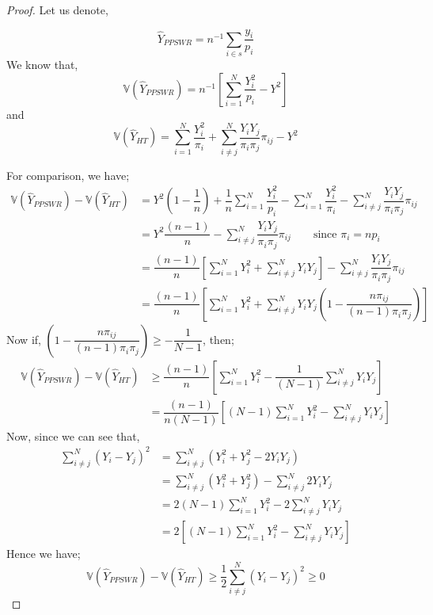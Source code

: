 \documentclass[12pt]{article}
\newcommand{\Var}{\mathbb{V}}
\theoremstyle{definition}
\begin{document}
\begin{proof}

    Let us denote, 

    \begin{equation}
        \hat{Y}_{PPSWR} = n^{-1} \sum_{i \in s} \dfrac{y_i}{p_i}
        \label{eqn:PPSWR-est}
    \end{equation}
    We know that, 
    \begin{equation}
        \Var(\hat{Y}_{PPSWR}) = n^{-1} \left[ \sum_{i=1}^N \dfrac{Y_i^2}{p_i}  - Y^2 \right]
        \label{eqn:PPSWR-var}
    \end{equation}
    and 
    \begin{equation}
        \Var(\hat{Y}_{HT}) = \sum_{i=1}^N \dfrac{Y_i^2}{\pi_i} + \sum_{i\neq j}^{N} \dfrac{Y_i Y_j}{\pi_i \pi_j} \pi_{ij} - Y^2
        \label{eqn:HT-var}
    \end{equation}
    
    For comparison, we have;
    \begin{align*}
        \Var(\hat{Y}_{PPSWR}) - \Var(\hat{Y}_{HT}) 
        & = Y^2 \left( 1 - \dfrac{1}{n} \right) + \dfrac{1}{n} \sum_{i=1}^N \dfrac{Y_i^2}{p_i} - \sum_{i=1}^N \dfrac{Y_i^2}{\pi_i} - \sum_{i\neq j}^{N} \dfrac{Y_i Y_j}{\pi_i \pi_j} \pi_{ij}\\
        & = Y^2 \dfrac{(n-1)}{n} - \sum_{i\neq j}^{N} \dfrac{Y_i Y_j}{\pi_i \pi_j} \pi_{ij} \qquad \text{since } \pi_i = np_i\\
        & = \dfrac{(n-1)}{n} \left[ \sum_{i=1}^N Y_i^2 + \sum_{i\neq j}^N Y_iY_j \right] - \sum_{i\neq j}^{N} \dfrac{Y_i Y_j}{\pi_i \pi_j} \pi_{ij}\\
        & = \dfrac{(n-1)}{n} \left[ \sum_{i=1}^N Y_i^2 + \sum_{i\neq j}^N Y_iY_j \left( 1 - \dfrac{n \pi_{ij}}{(n-1)\pi_i \pi_j} \right) \right]
    \end{align*}
    Now if, $\left( 1 - \dfrac{n \pi_{ij}}{(n-1)\pi_i \pi_j} \right) \geq -\dfrac{1}{N-1}$, then;
    \begin{align*}
        \Var(\hat{Y}_{PPSWR}) - \Var(\hat{Y}_{HT}) 
        & \geq \dfrac{(n-1)}{n} \left[ \sum_{i=1}^N Y_i^2 - \dfrac{1}{(N-1)} \sum_{i\neq j}^N Y_iY_j  \right]\\
        & = \dfrac{(n-1)}{n(N-1)} \left[ (N-1)\sum_{i=1}^N Y_i^2 - \sum_{i\neq j}^N Y_iY_j \right]
    \end{align*}
    Now, since we can see that,
    \begin{align*}
        \sum_{i\neq j}^N (Y_i - Y_j)^2
        & = \sum_{i\neq j}^N (Y_i^2 + Y_j^2 - 2Y_iY_j)\\
        & = \sum_{i\neq j}^N (Y_i^2 + Y_j^2) - \sum_{i\neq j}^N2Y_iY_j\\
        & = 2(N-1)\sum_{i = 1}^N Y_i^2  - 2\sum_{i\neq j}^N Y_iY_j\\
        & = 2 \left[ (N-1)\sum_{i=1}^N Y_i^2 - \sum_{i\neq j}^N Y_iY_j \right]
    \end{align*}
    Hence we have;
    $$\Var(\hat{Y}_{PPSWR}) - \Var(\hat{Y}_{HT}) \geq \frac{1}{2} \sum_{i\neq j}^N (Y_i - Y_j)^2 \geq 0$$
    
\end{proof}
\end{document}
